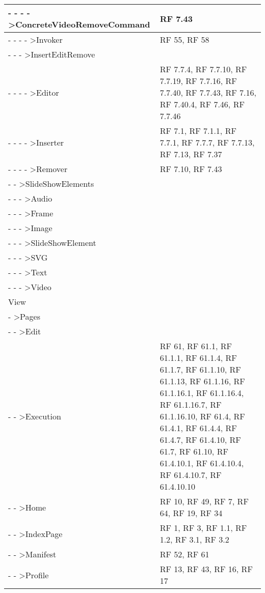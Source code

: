 {\begin{longtable} [c]{| p{8cm} | p{5cm} |}
 \hline 
- - - - >ConcreteVideoRemoveCommand & RF 7.43\\ 
 \hline 
- - - - >Invoker & RF 55, RF 58\\ 
 \hline 
- - - >InsertEditRemove & \\ 
 \hline 
- - - - >Editor & RF 7.7.4, RF 7.7.10, RF 7.7.19, RF 7.7.16, RF 7.7.40, RF 7.7.43, RF 7.16, RF 7.40.4, RF 7.46, RF 7.7.46\\ 
 \hline 
- - - - >Inserter & RF 7.1, RF 7.1.1, RF 7.7.1, RF 7.7.7, RF 7.7.13, RF 7.13, RF 7.37\\ 
 \hline 
- - - - >Remover & RF 7.10, RF 7.43\\ 
 \hline 
- - >SlideShowElements & \\ 
 \hline 
- - - >Audio & \\ 
 \hline 
- - - >Frame & \\ 
 \hline 
- - - >Image & \\ 
 \hline 
- - - >SlideShowElement & \\ 
 \hline 
- - - >SVG & \\ 
 \hline 
- - - >Text & \\ 
 \hline 
- - - >Video & \\ 
 \hline 
View & \\ 
 \hline 
- >Pages & \\ 
 \hline 
- - >Edit & \\ 
 \hline 
- - >Execution & RF 61, RF 61.1, RF 61.1.1, RF 61.1.4, RF 61.1.7, RF 61.1.10, RF 61.1.13, RF 61.1.16, RF 61.1.16.1, RF 61.1.16.4, RF 61.1.16.7, RF 61.1.16.10, RF 61.4, RF 61.4.1, RF 61.4.4, RF 61.4.7, RF 61.4.10, RF 61.7, RF 61.10, RF 61.4.10.1, RF 61.4.10.4, RF 61.4.10.7, RF 61.4.10.10\\ 
 \hline 
- - >Home & RF 10, RF 49, RF 7, RF 64, RF 19, RF 34\\ 
 \hline 
- - >IndexPage & RF 1, RF 3, RF 1.1, RF 1.2, RF 3.1, RF 3.2\\ 
 \hline 
- - >Manifest & RF 52, RF 61\\ 
 \hline 
- - >Profile & RF 13, RF 43, RF 16, RF 17\\ 
 \hline 
\end{longtable}}